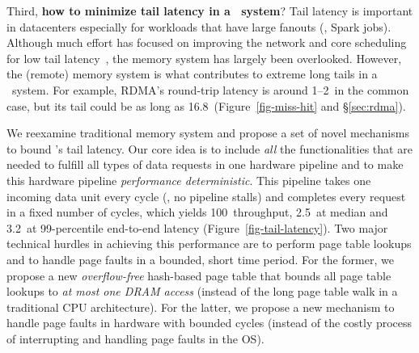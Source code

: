Third, \textbf{how to minimize tail latency in a \md\ system}?
Tail latency is important in datacenters especially for workloads that have large fanouts (\eg, Spark jobs).
Although much effort has focused on improving the network and core scheduling for low tail latency~\cite{nanoPU,Shenango,Shinjuku,ZygOS,RPCValet},
the memory system has largely been overlooked.
However, the (remote) memory system is what contributes to extreme long tails in a \md\ system.
For example, RDMA's round-trip latency is around 1--2\mus\ in the common case,
but its tail could be as long as 16.8\ms\ (Figure~\ref{fig-miss-hit} and \S\ref{sec:rdma}). %

We reexamine traditional memory system
and propose a set of novel mechanisms to bound \sys's tail latency.
Our core idea is to include {\em all} the functionalities that are needed to fulfill all types of data requests in one hardware pipeline
and to make this hardware pipeline {\em performance deterministic}.
This pipeline takes one incoming data unit every cycle (\ie, no pipeline stalls) and completes every request in a fixed number of cycles,
which yields 100\Gbps\ throughput, 2.5\mus\ at median and 3.2\mus\ at 99-percentile end-to-end latency (Figure~\ref{fig-tail-latency}).
Two major technical hurdles in achieving this performance are to perform page table lookups and to handle page faults in a bounded, short time period.  
For the former, we propose a new {\em overflow-free} hash-based page table that bounds all page table lookups to {\em at most one DRAM access} (instead of the long page table walk in a traditional CPU architecture).
For the latter, we propose a new mechanism to handle page faults in hardware with bounded cycles (instead of the costly process of interrupting and handling page faults in the OS).

\fi





